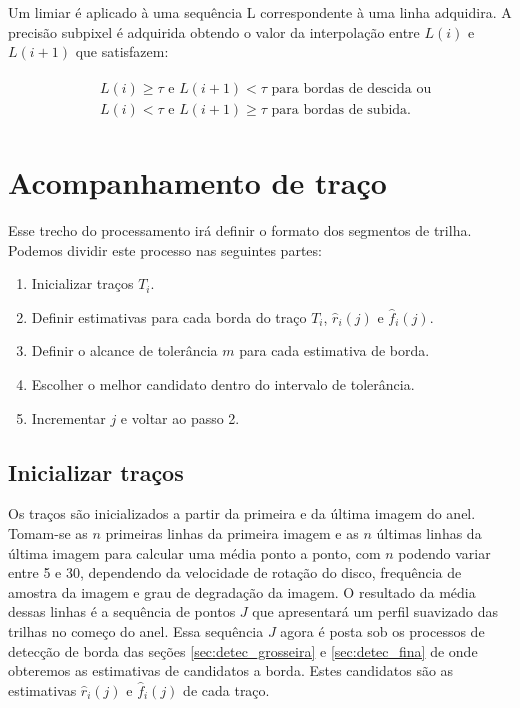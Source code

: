 \documentclass[
	12pt,				%
	openright,			%
	twoside,			%
	a4paper,			%
	english,			%
	french,				%
	spanish,			%
	brazil				%
	]{abntex2}
\newcommand{\estimr}{\hat{r}_i(j)}
\newcommand{\estimf}{\hat{f}_i(j)}
\begin{document}
Um limiar é aplicado à uma sequência L correspondente à uma linha adquidira. A precisão subpixel é adquirida obtendo o valor da interpolação entre $L(i)$ e $L(i+1)$ que satisfazem:


\begin{align}
\begin{split}
&L(i) \geq \tau \textrm{ e } L(i+1) < \tau 
\textrm{ para bordas de descida ou} \\
&L(i) < \tau \textrm{  e  } L(i+1) \geq \tau 
\textrm{ para bordas de subida.}
\end{split}
\end{align}

\section{Acompanhamento de traço}
Esse trecho do processamento irá definir o formato dos segmentos de trilha.  
Podemos dividir este processo nas seguintes partes:
\begin{enumerate}
\item Inicializar traços $T_i$.
\item Definir estimativas para cada borda do traço $T_i$, $\estimr$ e $\estimf$.
\item Definir o alcance de tolerância $m$ para cada estimativa de borda.
\item Escolher o melhor candidato dentro do intervalo de tolerância.
\item Incrementar $j$ e voltar ao passo 2.
\end{enumerate}


\subsection{Inicializar traços}
Os traços são inicializados a partir da primeira e da última imagem do anel. Tomam-se as $n$ primeiras linhas da primeira imagem e as $n$ últimas linhas da última imagem para calcular uma média ponto a ponto, com $n$ podendo variar entre 5 e 30, dependendo da velocidade de rotação do disco, frequência de amostra da imagem e grau de degradação da imagem. O resultado da média dessas linhas é a sequência de pontos $J$ que apresentará um perfil suavizado das trilhas no começo do anel. Essa sequência $J$ agora é posta sob os processos de detecção de borda das seções \ref{sec:detec_grosseira} e \ref{sec:detec_fina} de onde obteremos as estimativas de candidatos a borda. Estes candidatos são as estimativas $\estimr$ e $\estimf$ de cada traço.
\end{document}
